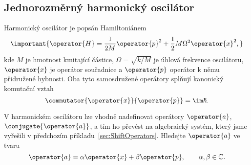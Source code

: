 \subsection{Jednorozměrný harmonický oscilátor}\label{sec:HarmonicOscillator}
Harmonický oscilátor je popsán Hamiltoniánem
\begin{equation}
    \important{
        \operator{H}
            =\frac{1}{2M}\operator{p}^{2}+\frac{1}{2}M\Omega^{2}\operator{x}^{2},
    }
    \label{eq:HOHamiltonianXY}
\end{equation}
kde $M$ je hmotnost kmitající částice, $\Omega=\sqrt{k/M}$ je úhlová frekvence oscilátoru, $\operator{x}$ je operátor souřadnice a $\operator{p}$ operátor k němu přidružené hybnosti.
Oba tyto samosdružené operátory splňují kanonický komutační vztah
\begin{equation}
    \commutator{\operator{x}}{\operator{p}}
        =\im\hbar.
\end{equation}

V harmonickém oscilátoru lze vhodně nadefinovat operátory $\operator{a}$, $\conjugate{\operator{a}}$, a tím ho převést na algebraický systém, který jsme vyřešili v předchozím příkladu~\ref{sec:ShiftOperators}.
Hledejte $\operator{a}$ ve tvaru
\begin{equation}
    \operator{a}
        =\alpha{\operator{x}}+\beta{\operator{p}},\qquad 
        \alpha,\beta\in\mathbb{C}.
    \label{eq:HOA}
\end{equation}

